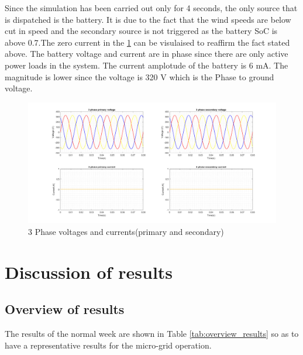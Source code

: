 \noindent Since the simulation has been carried out only for 4 seconds, the only source that is dispatched is the battery. It is due to the fact that the wind speeds are below cut in speed and the secondary source is not triggered as the battery SoC is above 0.7.The zero current in the \ref{fig:3ph_pri_sec} can be visulaised to reaffirm the fact stated above. 
The battery voltage and current are in phase since there are only active power  loads in the system. The current amplotude of the battery is 6 mA. The magnitude is lower since the voltage is 320 V which is the Phase to ground voltage.
\begin{figure}[H]
    \centering
    \includegraphics[width=1.1 \linewidth]{Final_report/Images/3ph_primary_secondary.png}
    \caption{3 Phase voltages and currents(primary and secondary)}
    \label{fig:3ph_pri_sec}
\end{figure}




\section{Discussion of results}

\subsection{Overview of results}
The results of the normal week are shown in Table \ref{tab:overview_results} so as to have a representative results for the micro-grid operation.\\



